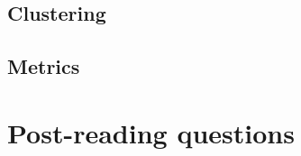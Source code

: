 \documentclass[nobib]{tufte-handout}
\begin{document}
\subsection{Clustering}
\subsection{Metrics}


\bigskip
\section{Post-reading questions}







\end{document}
